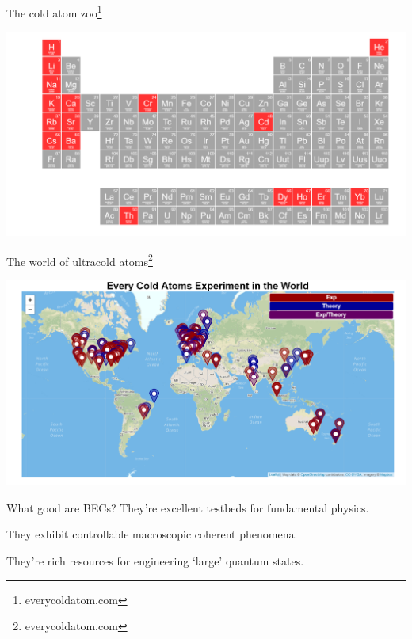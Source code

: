 \documentclass{beamer}
\begin{document}
\begin{frame}{The cold atom zoo\footnote[frame]{everycoldatom.com}}
     \begin{center}
    \includegraphics[width=\textwidth]{figures/Intro/all_cold_elements.png}
     \end{center}

\end{frame}


\begin{frame}{The world of ultracold atoms\footnote[frame]{everycoldatom.com}}
    \begin{center}
        \includegraphics[width=\textwidth]{figures/Intro/every_cold_atom.png}
    \end{center}
     
\end{frame}


\frame{\titlepage}

\begin{frame}{What good are BECs?}
    They're excellent testbeds for fundamental physics.\vspace{1in}
    
    They exhibit controllable macroscopic coherent phenomena.\vspace{1in}
    
    They're rich resources for engineering `large' quantum states.
\end{frame}
\end{document}
